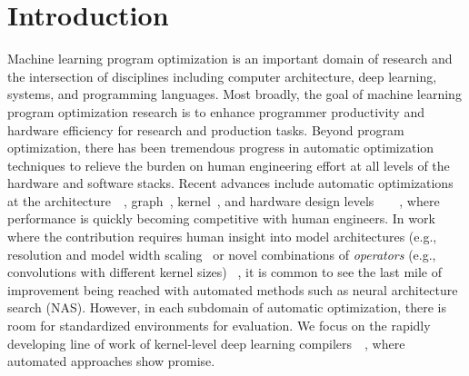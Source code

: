 \section{Introduction}
Machine learning program optimization is an important domain of research and the intersection of disciplines including computer architecture, deep learning, systems, and programming languages.
Most broadly, the goal of machine learning program optimization research is to enhance programmer productivity and hardware efficiency for research and production tasks.
Beyond program optimization, there has been tremendous progress in automatic optimization techniques to relieve the burden on human engineering effort at all levels of the hardware and software stacks.
Recent advances include automatic optimizations at the architecture~\cite{liu2018darts}~\cite{zoph2018learning}, graph~\cite{metaflow_sysml19}, kernel~\cite{NIPS2018_7599}, and hardware design levels~\cite{Koeplinger:2016:AGE:3007787.3001150}~\cite{koeplinger2018spatial}~\cite{moreau2019hardware}~\cite{8009208}, where performance is quickly becoming competitive with human engineers.
In work where the contribution requires human insight into model architectures (e.g., resolution and model width scaling~\cite{tan2019efficientnet} or novel combinations of \emph{operators} (e.g., convolutions with different kernel sizes) ~\cite{tan2019mixnet}, it is common to see the last mile of improvement being reached with automated methods such as neural architecture search (NAS).
However, in each subdomain of automatic optimization, there is room for standardized environments for evaluation.
We focus on the rapidly developing line of work of kernel-level deep learning compilers~\cite{xing2019dnnvm}~\cite{chen2018tvm}, where automated approaches show promise.


